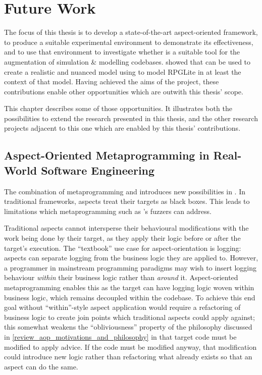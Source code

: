 \chapter{Future Work}\label{chap:future_work}

The focus of this thesis is to develop a state-of-the-art aspect-oriented
framework, to produce a suitable experimental environment to demonstrate its
effectiveness, and to use that environment to investigate whether
\aspectorientation{} is a suitable tool for the augmentation of simulation \&
modelling codebases.  showed that \aspectorientation{} can be used to
create a realistic and nuanced model using \pdsfthree{} to model RPGLite in at
least the context of that model. Having achieved the aims of the project, these
contributions enable other opportunities which are outwith this thesis' scope.

This chapter describes some of those opportunities. It illustrates both the
possibilities to extend the research presented in this thesis, and the other
research projects adjacent to this one which are enabled by this thesis'
contributions.

\section{Aspect-Oriented Metaprogramming in Real-World Software Engineering}
\label{future_work_aspect_oriented_metaprogramming}

The combination of metaprogramming and \aspectorientation introduces new
possibilities in \aop{}. In traditional \aspectorientation frameworks, aspects
treat their targets as black boxes. This leads to limitations which
\aspectoriented{} metaprogramming such as \pdsfthree{}'s fuzzers can address.

Traditional aspects cannot intersperse their behavioural modifications with the
work being done by their target, as they apply their logic before or after the
target's execution. The ``textbook'' use case for aspect-orientation is logging:
aspects can separate logging from the business logic they are applied to.
However, a programmer in mainstream programming paradigms may wish to insert
logging behaviour \emph{within} their business logic rather than \emph{around}
it. Aspect-oriented metaprogramming enables this as the target can have logging
logic woven within business logic, which remains decoupled within the codebase.
To achieve this end goal without ``within''-style aspect application would
require a refactoring of business logic to create join points which traditional
aspects could apply against; this somewhat weakens the ``obliviousness'' property of the
\aspectoriented{} philosophy discussed in
\cref{review_aop_motivations_and_philosophy} in that target code must be modified
to apply advice. If the code must be modified anyway, that modification could
introduce new logic rather than refactoring what already exists so that an
aspect can do the same. 

